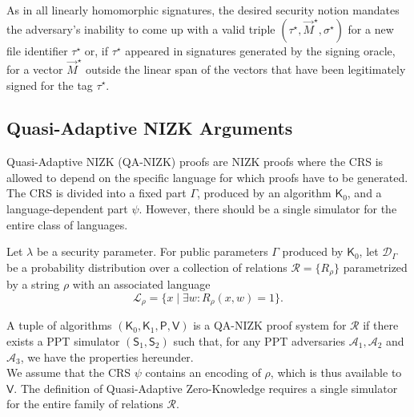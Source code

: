 \documentclass[10pt]{llncs}
\newcommand{\A}{\mathcal{A}}
\newcommand{\D}{\mathcal{D}}
\newcommand{\PP}{\mathsf{P}}
\newcommand{\VV}{\mathsf{V}}
\newcommand{\K}{\mathsf{K}}
\newcommand{\SIM}{\mathsf{S}}
\begin{document}
As in all linearly homomorphic signatures, the desired security notion
mandates the adversary's inability to come up with a valid triple
$(\tau^\star,\vec{M}^\star,\sigma^\star)$ for a new file identifier
$\tau^\star$ or, if $\tau^\star$ appeared in signatures generated by
the signing oracle, for a vector $\vec{M}^\star$ outside the linear
span of the vectors that have been legitimately signed for the tag
$\tau^\star$.



\subsection{Quasi-Adaptive NIZK Arguments}  \label{QA-NIZK}

Quasi-Adaptive NIZK (QA-NIZK) proofs \cite{DBLP:conf/asiacrypt/JutlaR13} are NIZK proofs where the CRS is
allowed to depend on the specific language for which proofs have to be
generated. The CRS is divided into a fixed part $\Gamma$, produced by
an algorithm $\K_0$, and a language-dependent part $\psi$. However,
there should be a single simulator for the entire class of languages.

Let $\lambda$ be a security parameter. For public parameters $\Gamma$
produced by $\K_0$, let $\mathcal{\D}_{\Gamma}$ be a probability
distribution over a collection of relations $\mathcal{R}=\{R_{\rho}\}$
parametrized by a string $\rho$ with an associated language
$$\mathcal{L}_{\rho}=\{x \mid \exists w : R_{\rho}(x,w)=1\}.$$

A tuple
of algorithms $(\K_0,\K_1,\PP,\VV)$ is a QA-NIZK proof system for
$\mathcal{R}$ if there exists a PPT simulator $(\SIM_1,\SIM_2)$ such
that, for any PPT adversaries $\A_1,\A_2$ and $\A_3$, we have the
 properties hereunder. \\
\indent 
We assume that the CRS $\psi$ contains an encoding of $\rho$, which is
thus available to $\VV$.  The definition of Quasi-Adaptive
Zero-Knowledge requires a single simulator for the entire family of
relations $\mathcal{R}$.
	  
\end{document}
